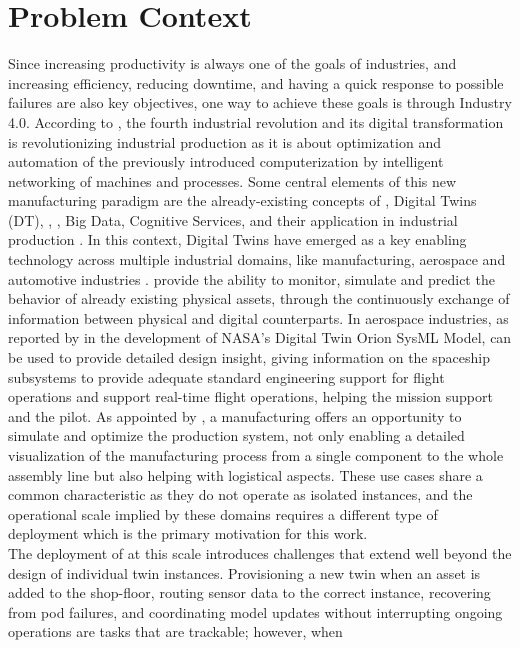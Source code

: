 \section{Problem Context}
\label{ch:problem-context}
Since increasing productivity is always one of the goals of industries, and increasing efficiency, reducing downtime, and having a 
quick response to possible failures are also key objectives, one way to achieve these goals is through Industry 4.0. 
According to , the fourth industrial revolution and its digital transformation is revolutionizing industrial 
production as it is about optimization and automation of the previously introduced computerization by intelligent networking of 
machines and processes. Some central elements of this new manufacturing paradigm are the already-existing concepts of 
\IoT, Digital Twins (DT), \AI, \ML, Big Data, Cognitive Services, and their application in industrial production \cite{Jacoby2020}. 
In this context, Digital Twins have emerged as a key enabling technology across multiple industrial domains, like manufacturing, 
aerospace and automotive industries \cite{Kang2024}. \DTs provide the ability to monitor, simulate and predict the behavior of 
already existing physical assets, through the continuously exchange of information between physical and digital counterparts. 
In aerospace industries, as reported by  in the development of NASA's Digital Twin Orion SysML Model, 
\DTs can be used to provide detailed design insight, giving information on the spaceship subsystems to provide adequate standard 
engineering support for flight operations and support real-time flight operations, helping the mission support and the pilot. As 
appointed by , a manufacturing \DT offers an opportunity to simulate and optimize the production system, 
not only enabling a detailed visualization of the manufacturing process from a single component to the whole assembly line but also 
helping with logistical aspects. These use cases share a common characteristic as they do not operate as isolated instances, 
and the operational scale implied by these domains requires a different type of deployment which is the primary motivation for 
this work.\\
The deployment of \DTs at this scale introduces challenges that extend well beyond the design of individual twin instances. 
Provisioning a new twin when an asset is added to the shop-floor, routing sensor data to the correct instance, recovering from pod 
failures, and coordinating model updates without interrupting ongoing operations are tasks that are trackable; however, when 
